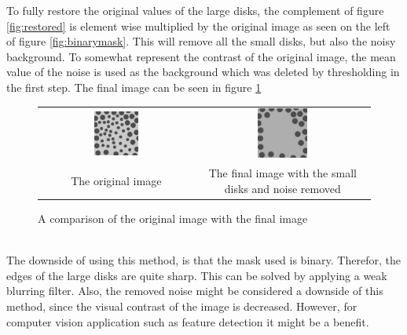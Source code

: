 \documentclass[a4paper]{article}
\begin{document}
\noindent To fully restore the original values of the large disks, the complement of figure \ref{fig:restored} is element wise multiplied by the original image as seen 
on the left of figure \ref{fig:binarymask}. This will remove all the small disks, but also the noisy background.
To somewhat represent the contrast of the original image, the mean value of the noise is used as the background which was deleted by thresholding
in the first step. The final image can be seen in figure \ref{fig:final}

\begin{figure}[H]
\centering
\begin{tabular}{cc}
    \includegraphics[width=0.3\textwidth]{../lab4ex3/blobs.png} & \includegraphics[width=0.3\textwidth]{../lab4ex3/final.png} \\
    The original image & The final image with the small disks and noise removed\\
\end{tabular}    
    
\caption{A comparison of the original image with the final image}
\label{fig:final}
\end{figure}


\newpage

~\\
\noindent The downside of using this method, is that the mask used is binary. Therefor, the edges of
the large disks are quite sharp. This can be solved by applying a weak blurring filter.
Also, the removed noise might be considered a downside of this method, since the visual contrast
of the image is decreased. However, for computer vision application such as feature detection
it might be a benefit.
\end{document}
